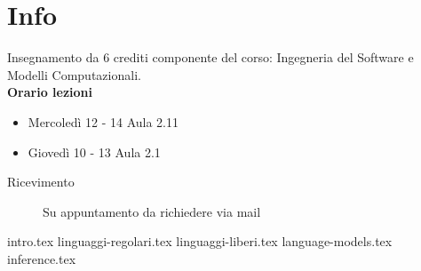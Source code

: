 \documentclass[12pt, a4paper]{scrreprt}
\begin{document}
\makefront{}

\begingroup
    \hypersetup{linkbordercolor=white, linkcolor=black} 
    \tableofcontents

    \newpage
\endgroup

\chapter{Info}\label{chap:info} %
Insegnamento da 6 crediti componente del corso: Ingegneria del Software e Modelli Computazionali.
\\
\textbf{Orario lezioni}
\begin{itemize}
    \item Mercoledì 12 - 14 Aula 2.11
    \item Giovedì 10 - 13 Aula 2.1
\end{itemize}
\begin{description}
    \item[Ricevimento] Su appuntamento da richiedere via mail
\end{description}
%
{intro.tex}
%
{linguaggi-regolari.tex}
%
{linguaggi-liberi.tex}
%
{language-models.tex}
%
{inference.tex}
%
\end{document}
